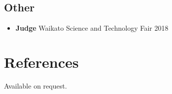 \documentclass[10pt,a4paper]{moderncv}
\begin{document}
\subsection{Other}

\vspace{5pt}

\begin{itemize}
\item \textbf{Judge} Waikato Science and Technology Fair 2018
\end{itemize}


\section{References}

Available on request.           

 







 

















\end{document}
